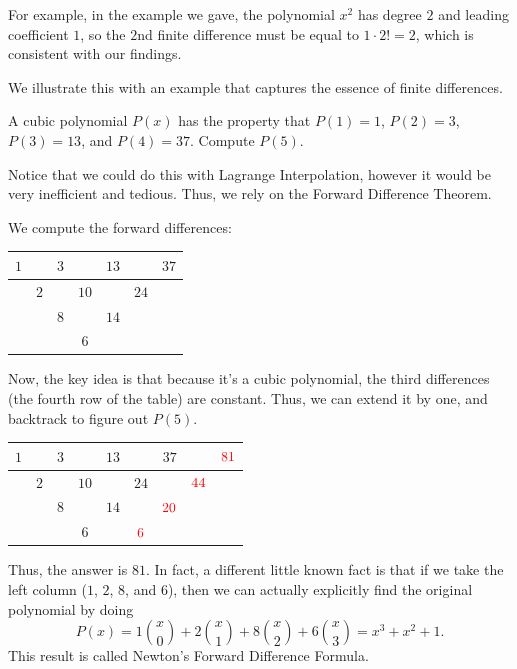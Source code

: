 \documentclass[11pt]{scrartcl}
\begin{document}
For example, in the example we gave, the polynomial $x^2$ has degree $2$ and leading coefficient $1$, so the $2$nd finite difference must be equal to $1\cdot 2! = 2$, which is consistent with our findings.

We illustrate this with an example that captures the essence of finite differences.

\begin{example*}
A cubic polynomial $P(x)$ has the property that $P(1) = 1$, $P(2) = 3$, $P(3) = 13$, and $P(4) = 37$. Compute $P(5)$.
\end{example*}

Notice that we could do this with Lagrange Interpolation, however it would be very inefficient and tedious. Thus, we rely on the Forward Difference Theorem. 

We compute the forward differences:

\begin{center}
\begin{tabular}{ccccccc}
\hline
$1$ & & $3$ & & $13$ & & $37$ \\
\hline
& $2$ & & $10$ & & $24$ & \\
\hline
& & $8$ & & $14$ & & \\
\hline
& & & $6$ & & & \\
\hline
\end{tabular}
\end{center}

Now, the key idea is that because it's a cubic polynomial, the third differences (the fourth row of the table) are constant. Thus, we can extend it by one, and backtrack to figure out $P(5)$.

\begin{center}
\begin{tabular}{ccccccccc}
\hline
$1$ & & $3$ & & $13$ & & $37$ & & $\textcolor{red}{81}$ \\
\hline
& $2$ & & $10$ & & $24$ & & $\textcolor{red}{44}$  &\\
\hline
& & $8$ & & $14$ & & $\textcolor{red}{20}$ & &\\
\hline
& & & $6$ & & $\textcolor{red}{6}$ & & &\\
\hline
\end{tabular}
\end{center}

Thus, the answer is $81$. In fact, a different little known fact is that if we take the left column ($1$, $2$, $8$, and $6$), then we can actually explicitly find the original polynomial by doing \[P(x) = 1\binom{x}{0}+2\binom{x}{1}+8\binom{x}{2}+6\binom{x}{3} = x^3+x^2+1.\] This result is called Newton's Forward Difference Formula.
\end{document}
